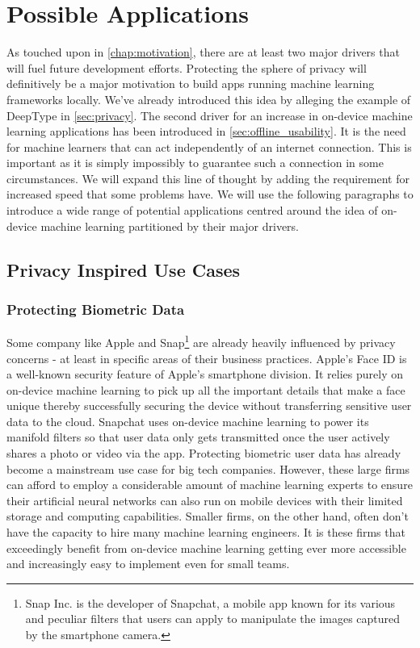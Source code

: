 \documentclass[
			   fontsize=11pt,
               paper=a4,
               bibliography=totoc,
               idxtotoc,
               headsepline,
               footsepline,
               footinclude=false,
               BCOR=12mm,
               DIV=13,
               openany,   %
               ]
               {scrbook}
\begin{document}
\section{Possible Applications}

As touched upon in \autoref{chap:motivation}, there are at least two major drivers that will fuel future development efforts. Protecting the sphere of privacy will definitively be a major motivation to build apps running machine learning frameworks locally. We've already introduced this idea by alleging the example of DeepType in \autoref{sec:privacy}. The second driver for an increase in on-device machine learning applications has been introduced in \autoref{sec:offline_usability}. It is the need for machine learners that can act independently of an internet connection. This is important as it is simply impossibly to guarantee such a connection in some circumstances. We will expand this line of thought by adding the requirement for increased speed that some problems have. We will use the following paragraphs to introduce a wide range of potential applications centred around the idea of on-device machine learning partitioned by their major drivers.

\subsection{Privacy Inspired Use Cases}

\subsubsection{Protecting Biometric Data}
Some company like Apple and Snap\footnote{Snap Inc. is the developer of Snapchat, a mobile app known for its various and peculiar filters that users can apply to manipulate the images captured by the smartphone camera.} are already heavily influenced by privacy concerns - at least in specific areas of their business practices. Apple's Face ID is a well-known security feature of Apple's smartphone division. It relies purely on on-device machine learning to pick up all the important details that make a face unique thereby successfully securing the device without transferring sensitive user data to the cloud. Snapchat uses on-device machine learning to power its manifold filters so that user data only gets transmitted once the user actively shares a photo or video via the app. Protecting biometric user data has already become a mainstream use case for big tech companies. However, these large firms can afford to employ a considerable amount of machine learning experts to ensure their artificial neural networks can also run on mobile devices with their limited storage and computing capabilities. Smaller firms, on the other hand, often don't have the capacity to hire many machine learning engineers. It is these firms that exceedingly benefit from on-device machine learning getting ever more accessible and increasingly easy to implement even for small teams.
\end{document}
